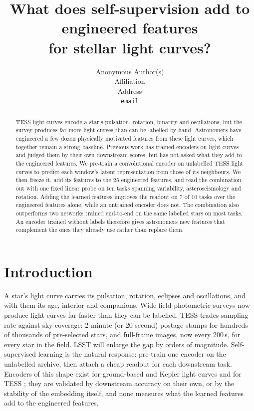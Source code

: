 \documentclass{article}
\title{What does self-supervision add to engineered features\\for stellar light curves?}
\author{Anonymous Author(s)\\Affiliation\\Address\\\texttt{email}}
\begin{document}
\maketitle

\begin{abstract}
TESS light curves encode a star's pulsation, rotation, binarity and oscillations, but the survey
produces far more light curves than can be labelled by hand. Astronomers have engineered a few
dozen physically motivated features from these light curves, which together remain a strong baseline. Previous work has trained
encoders on light curves and judged them by their own downstream scores, but has not asked what
they add to the engineered features. We pre-train a convolutional encoder on unlabelled TESS light curves to predict each
window's latent representation from those of its neighbours. We then freeze it, add its features to
the 25 engineered features, and read the combination out with one fixed linear probe on ten tasks
spanning variability, asteroseismology and rotation. Adding the learned features
improves the readout on 7 of 10 tasks over the engineered features alone, while an untrained encoder
does not. The combination also outperforms two networks trained end-to-end on the same labelled
stars on most tasks. An encoder trained without labels therefore gives astronomers new features
that complement the ones they already use rather than replace them.
\end{abstract}

\section{Introduction}

A star's light curve carries its pulsation, rotation, eclipses and oscillations, and with them its
age, interior and companions. Wide-field photometric surveys now produce light curves far faster
than they can be labelled. TESS
\citep{ricker2015} trades sampling rate against sky coverage: 2-minute (or 20-second) postage stamps
for hundreds of thousands of pre-selected stars, and full-frame images, now every 200\,s, for every
star in the field. LSST \citep{ivezic2019} will enlarge the gap by orders of magnitude. Self-supervised learning is the
natural response: pre-train one encoder on the unlabelled archive, then attach a cheap readout for
each downstream task. Encoders of this shape exist for ground-based and Kepler light curves
\citep{donoso2025astromer2,zuo2025falco,rui2026jepa} and for TESS \citep{poznanski2026}; they are
validated by downstream accuracy on their own, or by the stability of the embedding itself, and none
measures what the learned features add to the engineered features.
\end{document}

